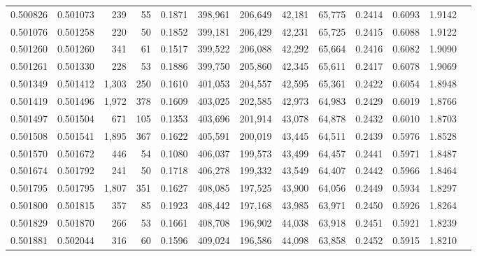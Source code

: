 \begin{tabular}{rrrrrrrrrrrrr}
0.500826 & 0.501073 &   239 &    55 &                                     0.1871 & 398,961 & 206,649 &  42,181 &  65,775 & 0.2414 & 0.6093 & 1.9142 \\
0.501076 & 0.501258 &   220 &    50 &                                     0.1852 & 399,181 & 206,429 &  42,231 &  65,725 & 0.2415 & 0.6088 & 1.9122 \\
0.501260 & 0.501260 &   341 &    61 &                                     0.1517 & 399,522 & 206,088 &  42,292 &  65,664 & 0.2416 & 0.6082 & 1.9090 \\
0.501261 & 0.501330 &   228 &    53 &                                     0.1886 & 399,750 & 205,860 &  42,345 &  65,611 & 0.2417 & 0.6078 & 1.9069 \\
0.501349 & 0.501412 & 1,303 &   250 &                                     0.1610 & 401,053 & 204,557 &  42,595 &  65,361 & 0.2422 & 0.6054 & 1.8948 \\
0.501419 & 0.501496 & 1,972 &   378 &                                     0.1609 & 403,025 & 202,585 &  42,973 &  64,983 & 0.2429 & 0.6019 & 1.8766 \\
0.501497 & 0.501504 &   671 &   105 &                                     0.1353 & 403,696 & 201,914 &  43,078 &  64,878 & 0.2432 & 0.6010 & 1.8703 \\
0.501508 & 0.501541 & 1,895 &   367 &                                     0.1622 & 405,591 & 200,019 &  43,445 &  64,511 & 0.2439 & 0.5976 & 1.8528 \\
0.501570 & 0.501672 &   446 &    54 &                                     0.1080 & 406,037 & 199,573 &  43,499 &  64,457 & 0.2441 & 0.5971 & 1.8487 \\
0.501674 & 0.501792 &   241 &    50 &                                     0.1718 & 406,278 & 199,332 &  43,549 &  64,407 & 0.2442 & 0.5966 & 1.8464 \\
0.501795 & 0.501795 & 1,807 &   351 &                                     0.1627 & 408,085 & 197,525 &  43,900 &  64,056 & 0.2449 & 0.5934 & 1.8297 \\
0.501800 & 0.501815 &   357 &    85 &                                     0.1923 & 408,442 & 197,168 &  43,985 &  63,971 & 0.2450 & 0.5926 & 1.8264 \\
0.501829 & 0.501870 &   266 &    53 &                                     0.1661 & 408,708 & 196,902 &  44,038 &  63,918 & 0.2451 & 0.5921 & 1.8239 \\
0.501881 & 0.502044 &   316 &    60 &                                     0.1596 & 409,024 & 196,586 &  44,098 &  63,858 & 0.2452 & 0.5915 & 1.8210 \\

\end{tabular}
